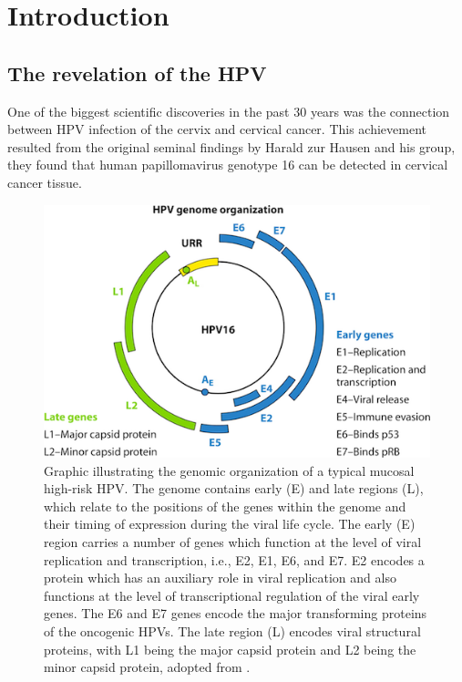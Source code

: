 \chapter{Introduction}\label{intro}

\section{The revelation of the HPV}
One of the biggest scientific discoveries in the past 30 years was the connection between HPV infection of the cervix and cervical cancer. This achievement resulted from the original seminal findings by Harald zur Hausen and his group, they found that human papillomavirus genotype 16 can be detected in cervical cancer tissue. 
\begin{figure}[ht]
	\centering
	\includegraphics[scale=0.7]{IMG/genoma.png}
	\caption{Graphic illustrating the genomic organization of a typical mucosal high-risk HPV. The genome contains early (E) and late regions (L), which relate to the positions of the genes within the genome and their timing of expression during the viral life cycle. The early (E) region carries a number of genes which function at the level of viral replication and transcription, i.e., E2, E1, E6, and E7. E2 encodes a protein which has an auxiliary role in viral replication and also functions at the level of transcriptional regulation of the viral early genes. The E6 and E7 genes encode the major transforming proteins of the oncogenic HPVs. The late region (L) encodes viral structural proteins, with L1 being the major capsid protein and L2 being the minor capsid protein, adopted from 
	\cite{Stanley215}.}
	\label{genoma}
\end{figure}

